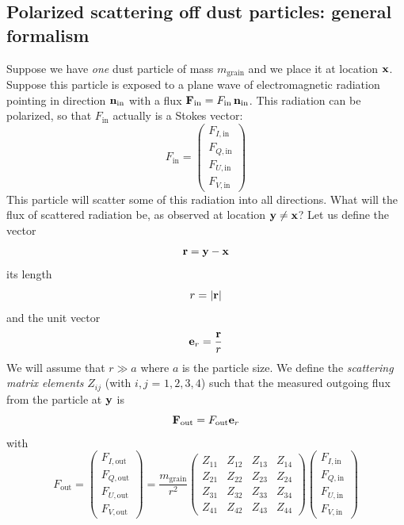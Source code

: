 \documentclass{report}
\begin{document}
\subsection{Polarized scattering off dust particles: general formalism}
Suppose we have {\em one} dust particle of mass $m_{\mathrm{grain}}$ and we
place it at location ${\bf x}$. Suppose this particle is exposed to a plane
wave of electromagnetic radiation pointing in direction ${\bf
  n}_{\mathrm{in}}$ with a flux ${\bf F}_{\mathrm{in}}=F_{\mathrm{in}}\,{\bf
  n}_{\mathrm{in}}$. This radiation can be polarized, so that
$F_{\mathrm{in}}$ actually is a Stokes vector:
\begin{equation}
F_{\mathrm{in}} = \left(\begin{matrix}
F_{I,\mathrm{in}}\\
F_{Q,\mathrm{in}}\\
F_{U,\mathrm{in}}\\
F_{V,\mathrm{in}}
\end{matrix}\right)
\end{equation}
This particle will scatter some of this radiation into all directions. 
What will the flux of scattered radiation be, as observed at location
${\bf y}\neq{\bf x}$? Let us define the vector
\begin{equation}
{\bf r} = {\bf y} - {\bf x}
\end{equation}
its length
\begin{equation}
r = |{\bf r}|
\end{equation}
and the unit vector
\begin{equation}
{\bf e}_r = \frac{{\bf r}}{r}
\end{equation}
We will assume that $r\gg a$ where $a$ is the particle size. 
We define the {\em scattering matrix elements} $Z_{ij}$ (with $i,j$ =
$1,2,3,4$) such that the measured outgoing flux from the particle
at ${\bf y}$ is
\begin{equation}
{\bf F}_{\mathrm{out}} = F_{\mathrm{out}}{\bf e}_r
\end{equation}
with
\begin{equation}
F_{\mathrm{out}} = \left(\begin{matrix}
F_{I,\mathrm{out}}\\
F_{Q,\mathrm{out}}\\
F_{U,\mathrm{out}}\\
F_{V,\mathrm{out}}
\end{matrix}\right)
=\frac{m_{\mathrm{grain}}}{r^2}
\left(\begin{matrix}
Z_{11} & Z_{12} & Z_{13} & Z_{14} \\
Z_{21} & Z_{22} & Z_{23} & Z_{24} \\
Z_{31} & Z_{32} & Z_{33} & Z_{34} \\
Z_{41} & Z_{42} & Z_{43} & Z_{44}
\end{matrix}\right)
\left(\begin{matrix}
F_{I,\mathrm{in}}\\
F_{Q,\mathrm{in}}\\
F_{U,\mathrm{in}}\\
F_{V,\mathrm{in}}
\end{matrix}\right)
\end{equation}
\end{document}
